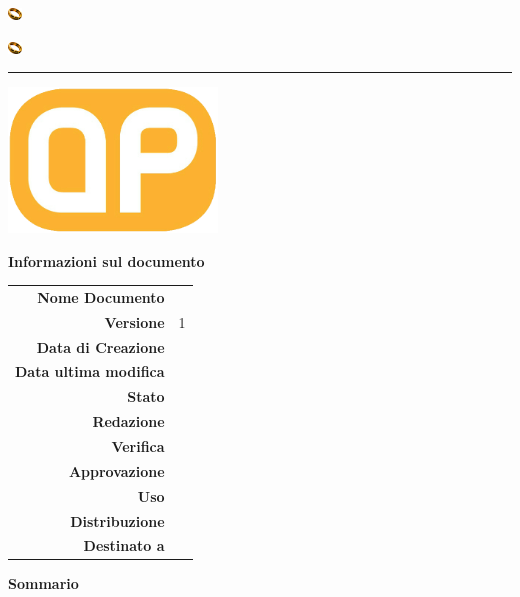 \begin{center}

\includegraphics[width=1em]{../Template/icone/logo_fotc.jpg}
\begin{large} \textbf{\gruppo} \end{large}
\includegraphics[width=1em]{../Template/icone/logo_fotc.jpg}
\vspace{0.2em}

\hrule
\vspace{3em}

\includegraphics[width=15em]{../Template/icone/logo.jpg}


\begin{center} 
  \begin{Huge}
  {\fontsize{15mm}{20mm}\selectfont \progetto} 
  \end{Huge}
\end{center}

\begin{Huge} \documento \end{Huge}

\begin{center}
\textbf{Informazioni sul documento} \\ \vspace{2em}
\small
\begin{tabular}{r|l}
	\textbf{Nome Documento} & \nomedocumentofisico \\
	\textbf{Versione}	& 1\\
	\textbf{Data di Creazione} & \datacreazione\\
	\textbf{Data ultima modifica} & \datamodifica\\
	\textbf{Stato} & \stato \\
	\textbf{Redazione}	& \redazione\\
	\textbf{Verifica}	& \verifica\\
	\textbf{Approvazione}	& \approvazione\\
	\textbf{Uso}  & \uso\\
	\textbf{Distribuzione} & \gruppo \\
	\textbf{Destinato a}  &  \destinateTo
\end{tabular}
\end{center}
\normalsize

\vspace{4em}

\textbf{Sommario\\} 


\vfill

\end{center}


